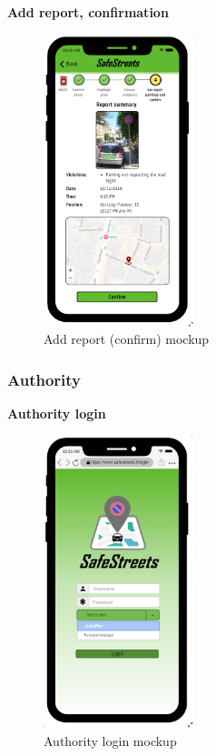 					\clearpage
					\begin{center}
						{\small \textbf{Add report, confirmation}}
					\end{center}
					\vspace{-5mm}
					\begin{figure}[h]
						\centering
						\includegraphics[height=8.5cm]{images/MockUp/User/Report4Confirm.pdf}
						\caption{Add report (confirm) mockup}
						\end{figure}
				\subsubsection{Authority}
					\vspace{-2mm}
					\begin{center}
						{\small \textbf{Authority login}}
					\end{center}
					\vspace{-5mm}
					\begin{figure}[!h]
						\centering
						\includegraphics[height=8.5cm]{images/MockUp/Authority/AuthorityLogin.png}
						\caption{Authority login mockup}
						\end{figure}
				\clearpage
